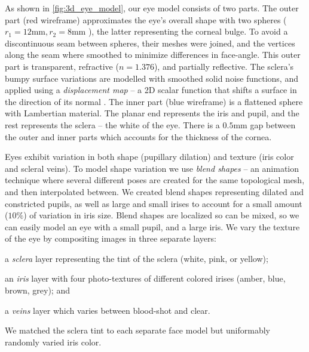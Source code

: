 
As shown in \autoref{fig:3d_eye_model}, our eye model consists of two parts.
The outer part (red wireframe) approximates the eye's overall shape with two spheres ($r_1\!=\!12\textrm{mm}, r_2\!=\!8\textrm{mm}$ \cite{ruhland2014look}), the latter representing the corneal bulge.
To avoid a discontinuous seam between spheres, their meshes were joined, and the vertices along the seam where smoothed to minimize differences in face-angle.
This outer part is transparent, refractive ($n\!=\!1.376$), and partially reflective.
The sclera's bumpy surface variations are modelled with smoothed solid noise functions, and applied using a \emph{displacement map} -- a 2D scalar function that shifts a surface in the direction of its normal \cite{lee2000displaced}.
The inner part (blue wireframe) is a flattened sphere with Lambertian material.
The planar end represents the iris and pupil, and the rest represents the sclera -- the white of the eye.
There is a $0.5\textrm{mm}$ gap between the outer and inner parts which accounts for the thickness of the cornea.

Eyes exhibit variation in both shape (pupillary dilation) and texture (iris color and scleral veins).
To model shape variation we use \emph{blend shapes} -- an animation technique where several different poses are created for the same topological mesh, and then interpolated between\cite{orvalho2012facial}. 
We created blend shapes representing dilated and constricted pupils, as well as large and small irises to account for a small amount ($10\%$) of variation in iris size.
Blend shapes are localized so can be mixed, so we can easily model an eye with a small pupil, and a large iris.
We vary the texture of the eye by compositing images in three separate layers:
\begin{inparaenum}
\item a \emph{sclera} layer representing the tint of the sclera (white, pink, or yellow);
\item an \emph{iris} layer with four photo-textures of different colored irises (amber, blue, brown, grey); and
\item a \emph{veins} layer which varies between blood-shot and clear.
\end{inparaenum}
We matched the sclera tint to each separate face model but uniformably randomly varied iris color.

